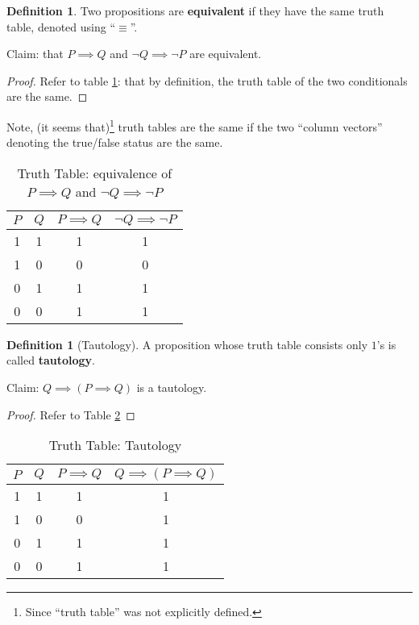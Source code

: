 \documentclass[12pt]{article}
\theoremstyle{definition}
\newtheorem{definition}[theorem]{Definition}
\theoremstyle{plain}
\begin{document}
\begin{definition}
    Two propositions are \textbf{equivalent} if they have the same truth table,
    denoted using ``$\equiv$''.
\end{definition}

\begin{example}
    Claim: that $P \implies Q$ and $\neg Q \implies \neg P$ are equivalent.

    \begin{proof}
        Refer to table \ref{table:equivalence_of_two_statements}: that by
        definition, the truth table of the two conditionals are the same.
    \end{proof}

    Note, (it seems that)\footnote{Since ``truth table'' was not explicitly
    defined.} truth tables are the same if the two ``column vectors'' denoting
    the true/false status are the same.
\end{example}

\begin{table}[htp!]
    \caption{Truth Table: equivalence of $P \implies Q$ and $\neg Q \implies \neg P$}
    \bigskip
    \centering
    \begin{tabular}{c|c|c|c}
        $P$ & $Q$ & $P \implies Q$ & $\neg Q \implies \neg P$ \\
        \hline
        1      & 1   & 1              & 1          \\
        1      & 0   & 0              & 0          \\
        0      & 1   & 1              & 1          \\
        0      & 0   & 1              & 1
    \end{tabular}
    \label{table:equivalence_of_two_statements}
\end{table}

\begin{definition}[Tautology]
    A proposition whose truth table consists only $1$'s is called
    \textbf{tautology}.
\end{definition}

\begin{example}
    Claim: $Q \implies (P \implies Q)$ is a tautology.
    \begin{proof}
        Refer to Table  \ref{table:tautology_example}
    \end{proof}
\end{example}
\begin{table}[!htb]
    \caption{Truth Table: Tautology}
    \bigskip
    \centering
    \begin{tabular}{c|c|c|c}
        $P$    & $Q$ & $P\implies Q$ & $Q \implies (P \implies Q)$ \\
        \hline
        1      & 1   & 1             & 1 \\
        1      & 0   & 0             & 1  \\
        0      & 1   & 1             & 1 \\
        0      & 0   & 1             & 1
    \end{tabular}
    \label{table:tautology_example}
\end{table}
\end{document}
